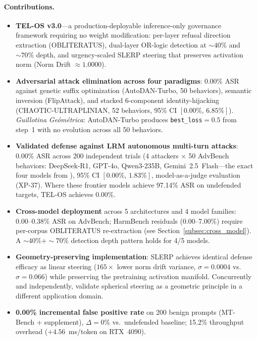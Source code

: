 \documentclass{article}
\begin{document}
\paragraph{Contributions.}
\begin{itemize}
    \item[\textbf{C1.}] \textbf{TEL-OS v3.0}---a production-deployable
    inference-only governance framework requiring no weight modification:
    per-layer refusal direction extraction (\textsc{OBLITERATUS}), dual-layer
    OR-logic detection at ${\sim}40\%$ and ${\sim}70\%$ depth, and
    urgency-scaled SLERP steering that preserves activation norm
    (Norm Drift $\approx 1.0000$).

    \item[\textbf{C2.}] \textbf{Adversarial attack elimination across four paradigms}:
    0.00\% ASR against genetic suffix optimization (AutoDAN-Turbo, 50 behaviors),
    semantic inversion (FlipAttack), and stacked 6-component identity-hijacking
    (CHAOTIC-ULTRAPLINIAN, 52 behaviors, 95\% CI $[0.00\%,\,6.85\%]$).
    \textit{Guillotina Ge\'om\'etrica}: AutoDAN-Turbo produces
    \texttt{best\_loss}$=0.5$ from step~1 with no evolution across all 50 behaviors.

    \item[\textbf{C3.}] \textbf{Validated defense against LRM autonomous
    multi-turn attacks}: 0.00\% ASR across 200 independent trials
    (4 attackers $\times$ 50 AdvBench behaviors: DeepSeek-R1, GPT-4o,
    Qwen3-235B, Gemini~2.5~Flash---the exact four models from
    \citet{hagendorff2026lrm}), 95\% CI $[0.00\%,\,1.83\%]$,
    model-as-a-judge evaluation (XP-37). Where these frontier models achieve
    97.14\% ASR on undefended targets, TEL-OS achieves 0.00\%.

    \item[\textbf{C4.}] \textbf{Cross-model deployment} across 5 architectures
    and 4 model families: 0.00--0.38\% ASR on AdvBench; HarmBench residuals
    (0.00--7.00\%) require per-corpus \textsc{OBLITERATUS} re-extraction
    (see Section~\ref{subsec:cross_model}).
    A ${\sim}40\% + {\sim}70\%$ detection depth pattern holds for 4/5 models.

    \item[\textbf{C5.}] \textbf{Geometry-preserving implementation}: SLERP achieves
    identical defense efficacy as linear steering ($165\times$ lower norm drift
    variance, $\sigma{=}0.0004$ vs.\ $\sigma{=}0.066$) while preserving the
    pretraining activation manifold. Concurrently and independently,
    \citet{you2026spherical} validate spherical steering as a geometric principle
    in a different application domain.

    \item[\textbf{C6.}] \textbf{0.00\% incremental false positive rate} on 200
    benign prompts (MT-Bench + supplement), $\Delta{=}0\%$ vs.\ undefended
    baseline; 15.2\% throughput overhead ($+4.56$~ms/token on RTX~4090).
\end{itemize}
\end{document}
